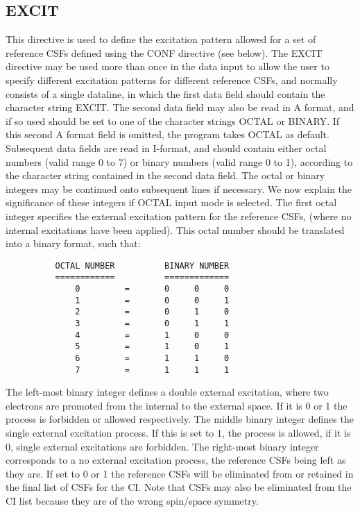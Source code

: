 \documentclass[11pt,fleqn]{article}
\begin{document}
\subsection[EXCIT]{EXCIT}

This directive is used to define the excitation pattern allowed for
a set of reference CSFs defined using the CONF directive (see
below). The EXCIT directive
may be used more than once in the data input to allow the user to
specify different excitation patterns for different reference CSFs,
and normally consists of a single dataline, in which the first
data field should contain the character string EXCIT.
The second data field may also be read in A format, and if
so used should be set to one of the character strings OCTAL or BINARY.
If this second A format field is omitted, the program takes OCTAL as 
default.
 Subsequent data fields are read in I-format, and should contain either
octal numbers (valid range 0 to 7) or binary numbers (valid range 0 to
1), according to the character string contained in the second data
field. The octal or binary integers may be continued onto subsequent
lines if necessary.
 We now explain the significance of these integers if OCTAL
input mode is selected.
 The first octal integer specifies the external excitation pattern for the
reference CSFs, (where no internal excitations have
been applied). This octal number should be translated into a binary
format, such that:

{
\footnotesize
\begin{verbatim}
          OCTAL NUMBER          BINARY NUMBER
          ============          =============
              0         =       0     0     0
              1         =       0     0     1
              2         =       0     1     0
              3         =       0     1     1
              4         =       1     0     0
              5         =       1     0     1
              6         =       1     1     0
              7         =       1     1     1
\end{verbatim}
}

 The left-most binary integer defines a double external excitation,
where two electrons are promoted from the internal to the
external space. If it is 0 or 1 the process is forbidden or allowed
respectively.
The middle binary integer defines the single external
excitation process. If this is set to 1, the process is allowed, if it
is 0, single external excitations are forbidden.
The right-most binary integer
corresponds to a no external excitation process, the reference
CSFs being left as they are.
If set to 0 or 1 the reference CSFs will be eliminated from or retained
in the final list of CSFs for the CI. Note
that CSFs may also be eliminated from the CI list because they are of
the wrong spin/space symmetry.\\
\end{document}
